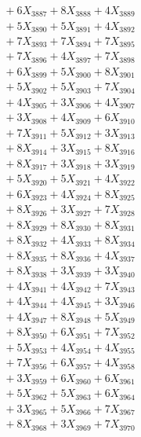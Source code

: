 \documentclass[a4paper,10pt]{article}
\begin{document}
{\begin{align}
&\;  + 6 X_{3887} + 8 X_{3888} + 4 X_{3889} \\[0.3ex]
&\;  + 5 X_{3890} + 5 X_{3891} + 4 X_{3892} \\[0.3ex]
&\;  + 7 X_{3893} + 7 X_{3894} + 7 X_{3895} \\[0.3ex]
&\;  + 7 X_{3896} + 4 X_{3897} + 7 X_{3898} \\[0.3ex]
&\;  + 6 X_{3899} + 5 X_{3900} + 8 X_{3901} \\[0.3ex]
&\;  + 5 X_{3902} + 5 X_{3903} + 7 X_{3904} \\[0.3ex]
&\;  + 4 X_{3905} + 3 X_{3906} + 4 X_{3907} \\[0.3ex]
&\;  + 3 X_{3908} + 4 X_{3909} + 6 X_{3910} \\[0.5ex]\allowbreak
&\;  + 7 X_{3911} + 5 X_{3912} + 3 X_{3913} \\[0.3ex]
&\;  + 8 X_{3914} + 3 X_{3915} + 8 X_{3916} \\[0.3ex]
&\;  + 8 X_{3917} + 3 X_{3918} + 3 X_{3919} \\[0.3ex]
&\;  + 5 X_{3920} + 5 X_{3921} + 4 X_{3922} \\[0.3ex]
&\;  + 6 X_{3923} + 4 X_{3924} + 8 X_{3925} \\[0.3ex]
&\;  + 8 X_{3926} + 3 X_{3927} + 7 X_{3928} \\[0.3ex]
&\;  + 8 X_{3929} + 8 X_{3930} + 8 X_{3931} \\[0.3ex]
&\;  + 8 X_{3932} + 4 X_{3933} + 8 X_{3934} \\[0.3ex]
&\;  + 8 X_{3935} + 8 X_{3936} + 4 X_{3937} \\[0.3ex]
&\;  + 8 X_{3938} + 3 X_{3939} + 3 X_{3940} \\[0.5ex]\allowbreak
&\;  + 4 X_{3941} + 4 X_{3942} + 7 X_{3943} \\[0.3ex]
&\;  + 4 X_{3944} + 4 X_{3945} + 3 X_{3946} \\[0.3ex]
&\;  + 4 X_{3947} + 8 X_{3948} + 5 X_{3949} \\[0.3ex]
&\;  + 8 X_{3950} + 6 X_{3951} + 7 X_{3952} \\[0.3ex]
&\;  + 5 X_{3953} + 4 X_{3954} + 4 X_{3955} \\[0.3ex]
&\;  + 7 X_{3956} + 6 X_{3957} + 4 X_{3958} \\[0.3ex]
&\;  + 3 X_{3959} + 6 X_{3960} + 6 X_{3961} \\[0.3ex]
&\;  + 5 X_{3962} + 5 X_{3963} + 6 X_{3964} \\[0.3ex]
&\;  + 3 X_{3965} + 5 X_{3966} + 7 X_{3967} \\[0.3ex]
&\;  + 8 X_{3968} + 3 X_{3969} + 7 X_{3970} \\[0.5ex]\allowbreak

\end{align}}
\end{document}
